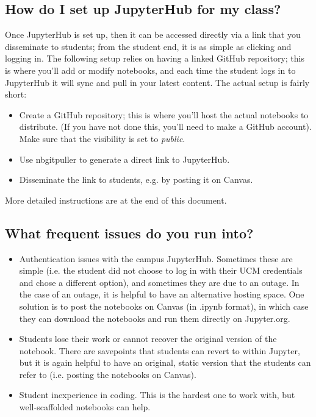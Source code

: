 \documentclass{amsart}
\begin{document}
\subsection*{How do I set up JupyterHub for my class?}

Once JupyterHub is set up, then it can be accessed directly via a link that you disseminate to students; from the student end, it is as simple as clicking and logging in. The following setup relies on having a linked GitHub repository; this is where you'll add or modify notebooks, and each time the student logs in to JupyterHub it will sync and pull in your latest content. The actual setup is fairly short:

\begin{itemize}
\item Create a GitHub repository; this is where you'll host the actual notebooks to distribute. (If you have not done this, you'll need to make a GitHub account). Make sure that the visibility is set to \emph{public}.

\item Use nbgitpuller to generate a direct link to JupyterHub.

\item Disseminate the link to students, e.g. by posting it on Canvas.
\end{itemize}
More detailed instructions are at the end of this document.

\subsection*{What frequent issues do you run into?}
\begin{itemize}
\item Authentication issues with the campus JupyterHub. Sometimes these are simple (i.e. the student did not choose to log in with their UCM credentials and chose a different option), and sometimes they are due to an outage. In the case of an outage, it is helpful to have an alternative hosting space. One solution is to post the notebooks on Canvas (in .ipynb format), in which case they can download the notebooks and run them directly on Jupyter.org.

\item Students lose their work or cannot recover the original version of the notebook. There are savepoints that students can revert to within Jupyter, but it is again helpful to have an original, static version that the students can refer to (i.e. posting the notebooks on Canvas).

\item Student inexperience in coding. This is the hardest one to work with, but well-scaffolded notebooks can help.
\end{itemize}
\end{document}
